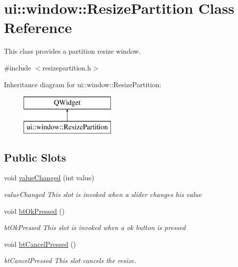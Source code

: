 \hypertarget{classui_1_1window_1_1_resize_partition}{}\section{ui\+:\+:window\+:\+:Resize\+Partition Class Reference}
\label{classui_1_1window_1_1_resize_partition}


This class provides a partition resize window.  




{\ttfamily \#include $<$resizepartition.\+h$>$}

Inheritance diagram for ui\+:\+:window\+:\+:Resize\+Partition\+:\begin{figure}[H]
\begin{center}
\leavevmode
\includegraphics[height=2.000000cm]{classui_1_1window_1_1_resize_partition}
\end{center}
\end{figure}
\subsection*{Public Slots}
\begin{DoxyCompactItemize}
\item 
void \mbox{\hyperlink{classui_1_1window_1_1_resize_partition_a6cdad6be2f435ad46bcf0b537b062a40}{value\+Changed}} (int value)
\begin{DoxyCompactList}\small\item\em value\+Changed This slot is invoked when a slider changes his value \end{DoxyCompactList}\item 
void \mbox{\hyperlink{classui_1_1window_1_1_resize_partition_ab742e4bcdf7e0684ad3e8a787309ef5d}{bt\+Ok\+Pressed}} ()
\begin{DoxyCompactList}\small\item\em bt\+Ok\+Pressed This slot is invoked when a ok button is pressed \end{DoxyCompactList}\item 
void \mbox{\hyperlink{classui_1_1window_1_1_resize_partition_a82f2b0a7f31c72e0ea6176415ddb855c}{bt\+Cancel\+Pressed}} ()
\begin{DoxyCompactList}\small\item\em bt\+Cancel\+Pressed This slot cancels the resize. \end{DoxyCompactList}\end{DoxyCompactItemize}
